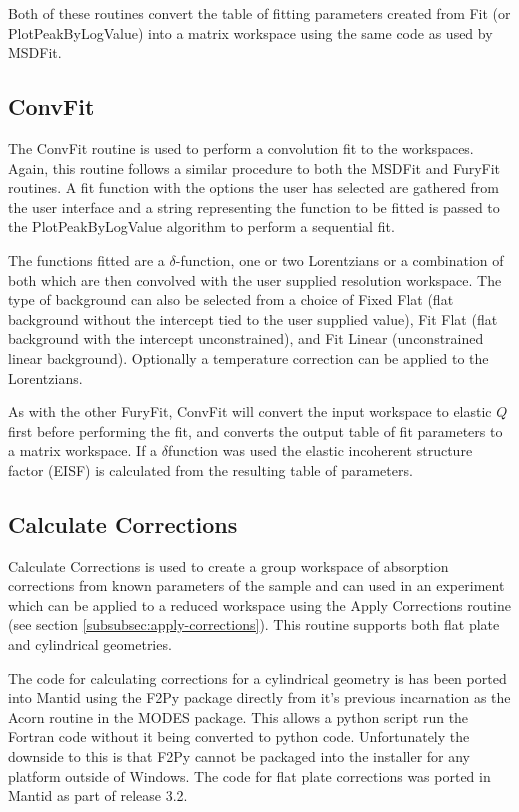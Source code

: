 \documentclass[paper=a4, fontsize=11pt]{scrartcl}	%
\numberwithin{equation}{section}															%
\numberwithin{figure}{section}																%
\numberwithin{table}{section}																%
\begin{document}
Both of these routines convert the table of fitting parameters created from Fit (or PlotPeakByLogValue) into a matrix workspace using the same code as used by MSDFit.

\subsection{ConvFit}
The ConvFit routine is used to perform a convolution fit to the workspaces. Again, this routine follows a similar procedure to both the MSDFit and FuryFit routines. A fit function with the options the user has selected are gathered from the user interface and a string representing the function to be fitted is passed to the PlotPeakByLogValue algorithm to perform a sequential fit.

The functions fitted are a $\delta$-function, one or two Lorentzians or a combination of both which are then convolved with the user supplied resolution workspace. The type of background can also be selected from a choice of Fixed Flat (flat background without the intercept tied to the user supplied value), Fit Flat (flat background with the intercept unconstrained), and Fit Linear (unconstrained linear background). Optionally a temperature correction can be applied to the Lorentzians.

As with the other FuryFit, ConvFit will convert the input workspace to elastic $Q$ first before performing the fit, and converts the output table of fit parameters to a matrix workspace. If a $\delta$function was used the elastic incoherent structure factor (EISF) is calculated from the resulting table of parameters.

\subsection{Calculate Corrections}
Calculate Corrections is used to create a group workspace of absorption corrections from known parameters of the sample and can used in an experiment which can be applied to a reduced workspace using the Apply Corrections routine (see section \ref{subsubsec:apply-corrections}). This routine supports both flat plate and cylindrical geometries.

The code for calculating corrections for a cylindrical geometry is has been ported into Mantid using the F2Py package directly from it's previous incarnation as the Acorn routine in the MODES package. This allows a python script run the Fortran code without it being converted to python code. Unfortunately the downside to this is that F2Py cannot be packaged into the installer for any platform outside of Windows. The code for flat plate corrections was ported in Mantid as part of release 3.2.
\end{document}
